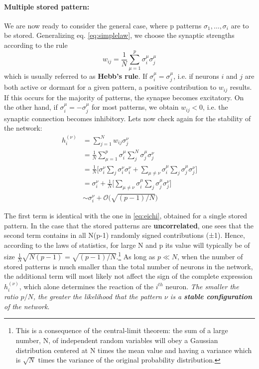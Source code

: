 \paragraph{Multiple stored pattern:}
We are now ready to consider the general case, where p patterns $\sigma_{1} , \dots,\sigma_{i}$ are to be stored. Generalizing eq. \ref{eq:simplelaw}, we choose the synaptic strengths according to the rule
\begin{equation}
    w_{ij}=\frac{1}{N}\sum_{\mu=1}^p\sigma_{i}^\mu \sigma_{j}^\mu
    \label{eq:simplelaw}
\end{equation}
which is usually referred to as \textbf{Hebb's rule}. 
If $\sigma_{i}^\mu=\sigma_{j}^\mu$, i.e.  if neurons $i$ and $j$ are both active or dormant for a given pattern, a positive contribution to $w_{ij}$ results. If this occurs for the majority of patterns, the synapse becomes excitatory. On the other hand, if $\sigma_{i}^\mu=-\sigma_{j}^\mu$ for most patterns, we obtain $w_{ij}<0$, i.e. the synaptic connection becomes inhibitory.
Lets now check again for the stability of the network:
\begin{equation}\begin{split}
    h_i^{(\nu)} &=\sum_{j=1}^{N}w_{ij}\sigma_{j}^\nu\\
    &=\frac{1}{N}\sum_{\mu=1}^{p}\sigma_{i}^\mu \sum_{j}^{N}\sigma_{j}^\mu \sigma_{j}^\nu\\
    &=\frac{1}{N}\Big[\sigma_{i}^\nu \sum_{j} \sigma_{i}^\nu \sigma_{i}^\nu+         \sum_{\mu \neq \nu}\sigma_{i}^\mu\sum_{j}\sigma_{j}^\mu\sigma_{j}^\nu \Big]\\
    &=\sigma_{i}^\nu+\frac{1}{N}\Big[\sum_{\mu \neq \nu}\sigma_{i}^\mu\sum_{j}\sigma_{j}^\mu\sigma_{j}^\nu \Big] \\
    &\sim \sigma_{i}^\nu+\mathcal{O}\Big(\sqrt{(p-1)/N}\Big)
\end{split}
\end{equation}

The first term is identical with the one in \ref{eq:eichi}, obtained for a single stored pattern. In the case that the stored patterns are \textbf{uncorrelated}, one sees that the second term contains in all N(p-1) randomly signed contributions (±1). Hence, according to the laws of statistics, for large N and p its value will typically be of size  $\frac{1}{N}\sqrt{N(p-1)}=\sqrt{(p-1)/N}$.\footnote{This is a consequence of the central-limit theorem: the sum of a large number, N, of independent random variables will obey a Gaussian distribution centered at N times the mean value and having a variance which is $\sqrt{N}$ times the variance of the original probability distribution.} 
As long as $p \ll N$, when the number of stored patterns is much smaller than the total number of neurons in the network, the additional term will most likely not affect the sign of the complete expression $h_{i}^{(\nu)}$, which alone determines the reaction of the $i^{th}$ neuron. \emph{The smaller the ratio $p/N$, the greater the likelihood that the pattern $\nu$ is a \textbf{stable configuration} of the network}.

